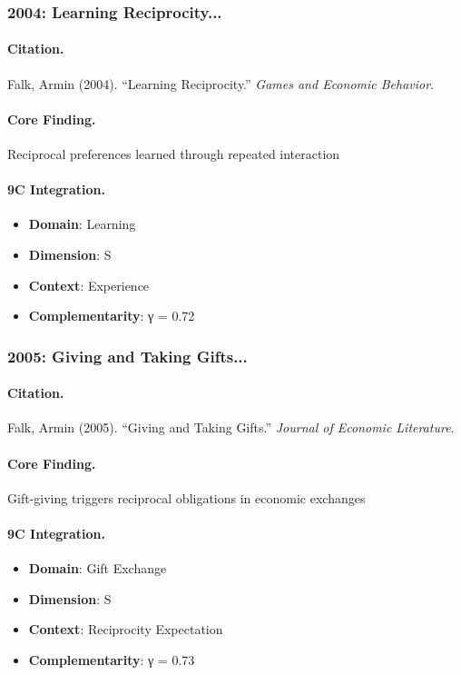 \subsubsection{2004: Learning Reciprocity...}

\paragraph{Citation.}
Falk, Armin (2004). ``Learning Reciprocity.''
\textit{Games and Economic Behavior}.

\paragraph{Core Finding.}
Reciprocal preferences learned through repeated interaction

\paragraph{9C Integration.}
\begin{itemize}[nosep]
  \item \textbf{Domain}: Learning
  \item \textbf{Dimension}: S
  \item \textbf{Context}: Experience
  \item \textbf{Complementarity}: γ = 0.72
\end{itemize}


\subsubsection{2005: Giving and Taking Gifts...}

\paragraph{Citation.}
Falk, Armin (2005). ``Giving and Taking Gifts.''
\textit{Journal of Economic Literature}.

\paragraph{Core Finding.}
Gift-giving triggers reciprocal obligations in economic exchanges

\paragraph{9C Integration.}
\begin{itemize}[nosep]
  \item \textbf{Domain}: Gift Exchange
  \item \textbf{Dimension}: S
  \item \textbf{Context}: Reciprocity Expectation
  \item \textbf{Complementarity}: γ = 0.73
\end{itemize}


